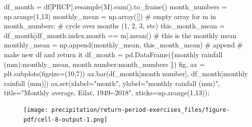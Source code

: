 \documentclass[
  letterpaper,
  DIV=11,
  numbers=noendperiod]{scrreprt}
\newenvironment{Shaded}{\begin{snugshade}}{\end{snugshade}}
\newcommand{\BuiltInTok}[1]{\textcolor[rgb]{0.00,0.23,0.31}{#1}}
\newcommand{\CommentTok}[1]{\textcolor[rgb]{0.37,0.37,0.37}{#1}}
\newcommand{\ControlFlowTok}[1]{\textcolor[rgb]{0.00,0.23,0.31}{#1}}
\newcommand{\DecValTok}[1]{\textcolor[rgb]{0.68,0.00,0.00}{#1}}
\newcommand{\KeywordTok}[1]{\textcolor[rgb]{0.00,0.23,0.31}{#1}}
\newcommand{\NormalTok}[1]{\textcolor[rgb]{0.00,0.23,0.31}{#1}}
\newcommand{\OperatorTok}[1]{\textcolor[rgb]{0.37,0.37,0.37}{#1}}
\newcommand{\StringTok}[1]{\textcolor[rgb]{0.13,0.47,0.30}{#1}}
\begin{document}
\begin{Shaded}
\begin{Highlighting}[]
\NormalTok{df\_month }\OperatorTok{=}\NormalTok{ df[}\StringTok{\textquotesingle{}PRCP\textquotesingle{}}\NormalTok{].resample(}\StringTok{\textquotesingle{}M\textquotesingle{}}\NormalTok{).}\BuiltInTok{sum}\NormalTok{().to\_frame()}
\NormalTok{month\_numbers }\OperatorTok{=}\NormalTok{ np.arange(}\DecValTok{1}\NormalTok{,}\DecValTok{13}\NormalTok{)}
\NormalTok{monthly\_mean }\OperatorTok{=}\NormalTok{ np.array([])  }\CommentTok{\# empty array}
\ControlFlowTok{for}\NormalTok{ m }\KeywordTok{in}\NormalTok{ month\_numbers:      }\CommentTok{\# cycle over months (1, 2, 3, etc)}
\NormalTok{    this\_month\_mean }\OperatorTok{=}\NormalTok{ df\_month[df\_month.index.month }\OperatorTok{==}\NormalTok{ m].mean()  }\CommentTok{\# this is the monthly mean}
\NormalTok{    monthly\_mean }\OperatorTok{=}\NormalTok{ np.append(monthly\_mean, this\_month\_mean)    }\CommentTok{\# append}
    \CommentTok{\# make new df and return it}
\NormalTok{df\_month }\OperatorTok{=}\NormalTok{ pd.DataFrame(\{}\StringTok{\textquotesingle{}monthly rainfall (mm)\textquotesingle{}}\NormalTok{:monthly\_mean,}
                          \StringTok{\textquotesingle{}month number\textquotesingle{}}\NormalTok{:month\_numbers}
\NormalTok{                         \})}
\NormalTok{fig, ax }\OperatorTok{=}\NormalTok{ plt.subplots(figsize}\OperatorTok{=}\NormalTok{(}\DecValTok{10}\NormalTok{,}\DecValTok{7}\NormalTok{))}
\NormalTok{ax.bar(df\_month[}\StringTok{\textquotesingle{}month number\textquotesingle{}}\NormalTok{], df\_month[}\StringTok{\textquotesingle{}monthly rainfall (mm)\textquotesingle{}}\NormalTok{])}
\NormalTok{ax.}\BuiltInTok{set}\NormalTok{(xlabel}\OperatorTok{=}\StringTok{"month"}\NormalTok{,}
\NormalTok{       ylabel}\OperatorTok{=}\StringTok{"monthly rainfall (mm)"}\NormalTok{,}
\NormalTok{       title}\OperatorTok{=}\StringTok{"Monthly average, Eilat, 1949{-}{-}2018"}\NormalTok{,}
\NormalTok{       xticks}\OperatorTok{=}\NormalTok{np.arange(}\DecValTok{1}\NormalTok{,}\DecValTok{13}\NormalTok{))}\OperatorTok{;}
\end{Highlighting}
\end{Shaded}

\begin{figure}[H]

{\centering \texttt{[image: precipitation/return-period-exercises\_files/figure-pdf/cell-8-output-1.png]}

}

\end{figure}
\end{document}
